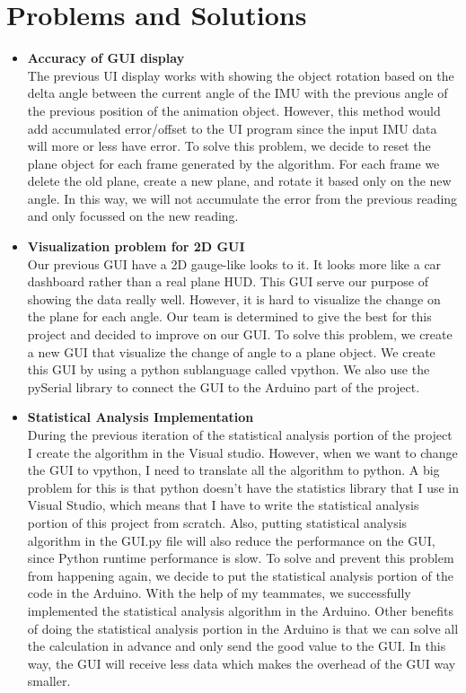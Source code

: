 \section{Problems and Solutions}
\begin{itemize}
	\item \textbf{Accuracy of GUI display}
	\\The previous UI display works with showing the object rotation based on the delta angle between the current angle of the IMU with the previous angle of the previous position of the animation object. However, this method would add accumulated error/offset to the UI program since the input IMU data will more or less have error. To solve this problem, we decide to reset the plane object for each frame generated by the algorithm. For each frame we delete the old plane, create a new plane, and rotate it based only on the new angle. In this way, we will not accumulate the error from the previous reading and only focussed on the new reading.\\

	\item \textbf{Visualization problem for 2D GUI}
	\\Our previous GUI have a 2D gauge-like looks to it. It looks more like a car dashboard rather than a real plane HUD. This GUI serve our purpose of showing the data really well. However, it is hard to visualize the change on the plane for each angle. Our team is determined to give the best for this project and decided to improve on our GUI. To solve this problem, we create a new GUI that visualize the change of angle to a plane object. We create this GUI by using a python sublanguage called vpython. We also use the pySerial library to connect the GUI to the Arduino part of the project.\\

	\item \textbf{Statistical Analysis Implementation}
	\\During the previous iteration of the statistical analysis portion of the project I create the algorithm in the Visual studio. However, when we want to change the GUI to vpython, I need to translate all the algorithm to python. A big problem for this is that python doesn't have the statistics library that I use in Visual Studio, which means that I have to write the statistical analysis portion of this project from scratch. Also, putting statistical analysis algorithm in the GUI.py file will also reduce the performance on the GUI, since Python runtime performance is slow. To solve and prevent this problem from happening again, we decide to put the statistical analysis portion of the code in the Arduino. With the help of my teammates, we successfully implemented the statistical analysis algorithm in the Arduino. Other benefits of doing the statistical analysis portion in the Arduino is that we can solve all the calculation in advance and only send the good value to the GUI. In this way, the GUI will receive less data which makes the overhead of the GUI way smaller.\\
\end{itemize}



